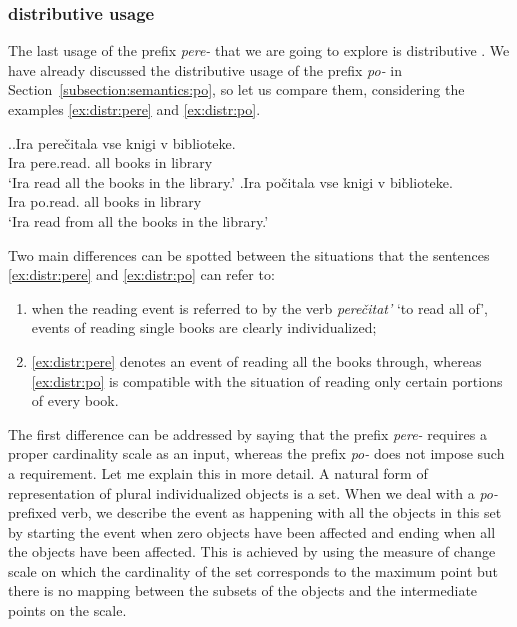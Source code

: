 \subsubsection{distributive  usage}
The last usage of the prefix \textit{pere-}   that we are going to explore is distributive . We have already discussed the distributive  usage of the prefix \textit{po-}   in Section~\ref{subsection:semantics:po}, so let us compare them, considering the examples \ref{ex:distr:pere} and \ref{ex:distr:po}.

\ex.\ag.\label{ex:distr:pere}Ira pere\v{c}itala vse knigi v biblioteke.\\
Ira pere.read. all books in library\\
\trans `Ira read all the books in the library.'
\bg.\label{ex:distr:po}Ira po\v{c}itala vse knigi v biblioteke.\\
Ira po.read. all books in library\\
\trans `Ira read from all the books in the library.'

Two main differences can be spotted between the situations that the sentences \ref{ex:distr:pere} and \ref{ex:distr:po} can refer to:
\begin{enumerate}
\item when the reading event is referred to by the verb \textit{pere\v{c}itat'} `to read all of', events of reading single books are clearly individualized;
\item \ref{ex:distr:pere} denotes an event of reading all the books through, whereas \ref{ex:distr:po} is compatible with the situation of reading only certain portions of every book.
\end{enumerate}

The first difference can be addressed by saying that the prefix \textit{pere-}   requires a proper cardinality scale as an input, whereas the prefix \textit{po-}   does not impose such a requirement. Let me explain this in more detail. A natural form of representation of plural individualized objects is a set. When we deal with a \textit{po-}  prefixed verb, we describe the event as happening with all the objects in this set by starting the event when zero objects have been affected and ending when all the objects have been affected. This is achieved by using the measure of change scale on which the cardinality of the set corresponds to the maximum point but there is no mapping between the subsets of the objects and the intermediate points on the scale.

